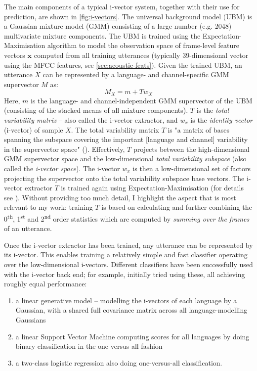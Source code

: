 \documentclass[bsc,frontabs,twoside,singlespacing,parskip,deptreport]{infthesis}
\begin{document}
{{    The main components of a typical i-vector system, together with their use for prediction, are shown in \autoref{fig:i-vectors}. The universal background model (UBM) is a Gaussian mixture model (GMM) consisting of a large number (e.g. 2048) multivariate mixture components. The UBM is trained using the Expectation-Maximisation algorithm to model the observation space of frame-level feature vectors $\mathbf{x}$ computed from all training utterances (typically 39-dimensional vector using the MFCC features, see \autoref{sec:acoustic-feats}). Given the trained UBM, an utterance $X$ can be represented by a language- and channel-specific GMM supervector $M$ as:
    \begin{equation}
      \label{eq:supervector}
      M_X = m + Tw_X
    \end{equation}
    Here, $m$ is the language- and channel-independent GMM supervector of the UBM (consisting of the stacked means of all mixture components). $T$ is the \textit{total variability matrix} -- also called the i-vector extractor, and $w_x$ is the \textit{identity vector} (i-vector) of sample $X$. The total variability matrix $T$ is "a matrix of bases spanning the subspace covering the important [language and channel] variability in the supervector space" (\citeauthor[p.862]{Martinez_et_al_2011}). Effectively, $T$ projects between the high-dimensional GMM supervector space and the low-dimensional \textit{total variability subspace} (also called the \textit{i-vector space}). The i-vector $w_x$ is then a low-dimensional set of factors projecting the supervector onto the total variability subspace base vectors. The i-vector extractor $T$ is trained again using Expectation-Maximisation (for details see \citet[p. 100]{ivector_tutorial}). Without providing too much detail, I highlight the aspect that is most relevant to my work: training $T$ is based on calculating and further combining the 0\textsuperscript{th}, 1\textsuperscript{st} and 2\textsuperscript{nd} order statistics which are computed by \textit{summing over the frames} of an utterance.

    Once the i-vector extractor has been trained, any utterance can be represented by its i-vector. This enables training a relatively simple and fast classifier operating over the low-dimensional i-vectors. Different classifiers have been successfully used with the i-vector back end; for example, \citeauthor{Martinez_et_al_2011} initially tried using these, all achieving roughly equal performance:
    \begin{enumerate}
      \item {a linear generative model -- modelling the i-vectors of each language by a Gaussian, with a shared full covariance matrix across all language-modelling Gaussians}
      \item {a linear Support Vector Machine computing scores for all languages by doing binary classification in the one-versus-all fashion}
      \item {a two-class logistic regression also doing one-versus-all classification.}
    \end{enumerate}

}}
\end{document}
